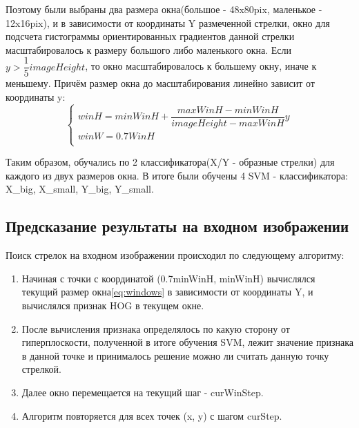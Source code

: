 Поэтому были выбраны два размера окна(большое - 48x80pix, маленькое - 12x16pix), и в зависимости от координаты Y размеченной стрелки, окно для подсчета гистограммы ориентированных градиентов данной стрелки масштабировалось к размеру большого либо маленького окна. Если $y > \dfrac{1}{5}imageHeight$, то окно масштабировалось к большему окну, иначе к меньшему. Причём  размер окна до масштабирования линейно зависит от координаты y:
\newline
\begin{equation}
\begin{cases}
winH = minWinH + \dfrac{maxWinH - minWinH}{imageHeight - maxWinH}y\\
winW = 0.7WinH\\
\end{cases}
\label{eq:windows}
\end{equation}

Таким образом, обучались по 2 классификатора(X/Y - образные стрелки) для каждого из двух размеров окна. В итоге были обучены 4 SVM - классификатора: X\_big, X\_small, Y\_big, Y\_small.

\subsection{Предсказание результаты на входном изображении}
Поиск стрелок на входном изображении происходил по следующему алгоритму:



\begin{enumerate}
	\item Начиная с точки с координатой (0.7minWinH, minWinH) вычислялся текущий размер окна\ref{eq:windows} в зависимости от координаты Y, и вычислялся признак HOG в текущем окне. 
	\item После вычисления признака определялось по какую сторону от гиперплоскости, полученной в итоге обучения SVM, лежит значение признака в данной точке и принималось решение можно ли считать данную точку стрелкой.
	\item Далее окно перемещается на текущий шаг - curWinStep.
	\item Алгоритм повторяется для всех точек (x, y) с шагом curStep.
\end{enumerate}

